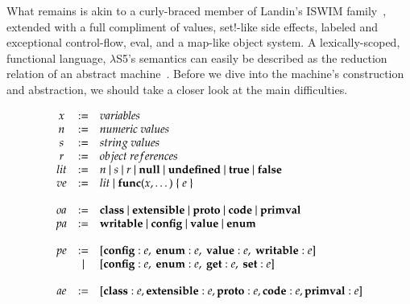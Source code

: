 \documentclass[preprint,9pt]{sigplanconf} %
\begin{document}
What remains is akin to a curly-braced member of Landin's ISWIM
family~\cite{landin1966next}, extended with a full compliment of
values, set!-like side effects, labeled and exceptional control-flow,
eval, and a map-like object system. A lexically-scoped, functional
language, $\lambda$S5's semantics can easily be described as the
reduction relation of an abstract machine~\cite{felleisen1986control,
  felleisen2009semantics}. Before we dive into the machine's
construction and abstraction, we should take a closer look at the
main difficulties.

\begin{figure}
\[
\begin{array}{ccll}
\mvar&:=&\multicolumn{2}{l}{variables}\\
\mnum&:=&\multicolumn{2}{l}{numeric\ values}\\
\mstr&:=&\multicolumn{2}{l}{string\ values}\\
\moloc&:=&\multicolumn{2}{l}{object\ references}\\
\mlit&:=&\multicolumn{2}{l}{\mnum\ |\ \mstr\ |\ \moloc\ |\ {\bf{null}}\ |\ {\bf{undefined}}\ |\ {\bf{true}}\ |\ {\bf{false}}}\\
\mvexp&:=&\multicolumn{2}{l}{\mlit\ |\ {\bf{func}}(\mvar,\dots)\ \{\ \mexp\ \}}\\\\
\moattr&:=&\multicolumn{2}{l}{{\bf{class}}\ |\ {\bf{extensible}}\ |\ {\bf{proto}}\ |\ {\bf{code}}\ |\ {\bf{primval}}}\\
\mpattr&:=&\multicolumn{2}{l}{{\bf{writable}}\ |\ {\bf{config}}\ |\ {\bf{value}}\ |\ {\bf{enum}}}\\\\
\mpexp&:=&\multicolumn{2}{l}{\text{[}{\bf{config}}:\mexp,\ {\bf{enum}}:\mexp,\ {\bf{value}}:\mexp,\ {\bf{writable}}:\mexp\text{]}}\\
&|&\multicolumn{2}{l}{\text{[}{\bf{config}}:\mexp,\ {\bf{enum}}:\mexp,\ {\bf{get}}:\mexp,\ {\bf{set}}:\mexp\text{]}}\\\\
\maexp&:=&\multicolumn{2}{l}{\text{[}{\bf{class}}:\mexp,{\bf{extensible}}:\mexp,{\bf{proto}}:\mexp,{\bf{code}}:\mexp,{\bf{primval}}:\mexp\text{]}}\\\\

\end{array}\]
\end{figure}
\end{document}
